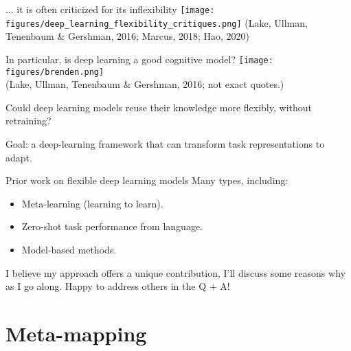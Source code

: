\documentclass{beamer}
\begin{document}
\begin{frame}{... it is often criticized for its inflexibility}
\texttt{[image: figures/deep\_learning\_flexibility\_critiques.png]}
{\scriptsize (Lake, Ullman, Tenenbaum \& Gershman, 2016; Marcus, 2018; Hao, 2020)}
\end{frame}

\begin{frame}{In particular, is deep learning a good cognitive model?}
\phantom{}
{
\centering
\texttt{[image: figures/brenden.png]}\\
}
{\scriptsize (Lake, Ullman, Tenenbaum \& Gershman, 2016; not exact quotes.)}
\end{frame}

\begin{frame}[standout]
Could deep learning models reuse their knowledge more flexibly, without retraining?
\end{frame}


\begin{frame}[standout]
Goal: a deep-learning framework that can transform task representations to adapt.
\end{frame}

\begin{frame}{Prior work on flexible deep learning models}
Many types, including:
\begin{itemize}
    \item Meta-learning (learning to learn).
    \item Zero-shot task performance from language.
    \item Model-based methods. 
\end{itemize}
I believe my approach offers a unique contribution, I'll discuss some reasons why as I go along. Happy to address others in the Q + A!
\end{frame}

\section{Meta-mapping}
\end{document}
